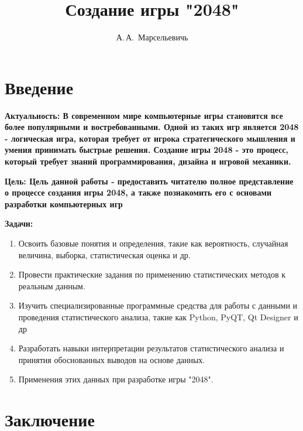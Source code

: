 \documentclass[14pt, oneside]{altsu-report}
\title{Создание игры "2048"}
\author{А.\,А.~Марсельевичь}
\institute{Институт цифровых технологий, электроники и физики}
\date{\the\year}
\begin{document}
\maketitle

\setcounter{page}{2}
\makeabstract
\tableofcontents

\chapter*{Введение}

\textbf{Актуальность:
В современном мире компьютерные игры становятся все более популярными и востребованными. Одной из таких игр является 2048 - логическая игра, которая требует от игрока стратегического мышления и умения принимать быстрые решения. Создание игры 2048 - это процесс, который требует знаний программирования, дизайна и игровой механики.}

\textbf{Цель:
Цель данной работы - предоставить читателю полное представление о процессе создания игры 2048, а также познакомить его с основами разработки компьютерных игр}

\textbf{Задачи:}
\begin{enumerate}
\item  Освоить базовые понятия и определения, такие как вероятность, случайная величина, выборка, статистическая оценка и др.
\item Провести практические задания по применению статистических методов к реальным данным.
\item Изучить специализированные программные средства для работы с данными и проведения статистического анализа, такие как  Python, PyQT, Qt Designer и др
\item Разработать навыки интерпретации результатов статистического анализа и принятия обоснованных выводов на основе данных.
\item Применения этих данных при разработке игры "2048".
\end{enumerate}





\chapter*{Заключение}
\end{document}
